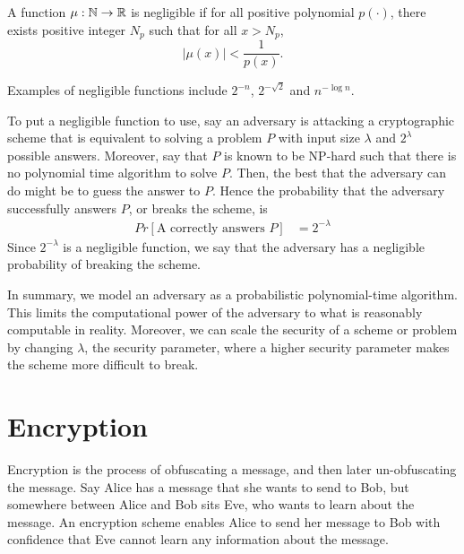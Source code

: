 \begin{definition}
\label{defn:negible}
A function $\mu : \mathbb{N} \to \mathbb{R}$ is negligible if for all positive polynomial $p(\cdot)$, there exists positive integer $N_p$ such that for all $x > N_p$, 
\begin{equation}
    |\mu(x)| < \frac{1}{p(x)}.
\end{equation}
\cite{goldreich}
\end{definition}

Examples of negligible functions include $2^{-n}$, $2^{- \sqrt{2}}$ and $n^{- \log n}$. 

To put a negligible function to use, say an adversary is attacking a cryptographic scheme that is equivalent to solving a problem $P$ with input size $\lambda$ and $2^{\lambda}$ possible answers. 
Moreover, say that $P$ is known to be NP-hard such that there is no polynomial time algorithm to solve $P$. 
Then, the best that the adversary can do might be to guess the answer to $P$.
Hence the probability that the adversary successfully answers $P$, or breaks the scheme, is 
\begin{align*}
Pr[\text{A correctly answers $P$}] & = {2^{- \lambda}}
\end{align*}
Since $2^{- \lambda}$ is a negligible function, we say that the adversary has a negligible probability of breaking the scheme. 

In summary, we model an adversary as a probabilistic polynomial-time algorithm. 
This limits the computational power of the adversary to what is reasonably computable in reality. 
Moreover, we can scale the security of a scheme or problem by changing $\lambda$, the security parameter, where a higher security parameter makes the scheme more difficult to break. 

\section{Encryption}

Encryption is the process of obfuscating a message, and then later un-obfuscating the message.
Say Alice has a message that she wants to send to Bob, but somewhere between Alice and Bob sits Eve, who wants to learn about the message.
An encryption scheme enables Alice to send her message to Bob with confidence that Eve cannot learn any information about the message. 

